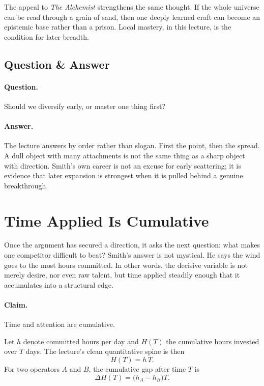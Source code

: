 The appeal to \emph{The Alchemist} strengthens the same thought. If the whole universe can be read through a grain of sand, then one deeply learned craft can become an epistemic base rather than a prison. Local mastery, in this lecture, is the condition for later breadth.

\subsection{Question \& Answer}

\paragraph{Question.}
Should we diversify early, or master one thing first?

\paragraph{Answer.}
The lecture answers by order rather than slogan. First the point, then the spread. A dull object with many attachments is not the same thing as a sharp object with direction. Smith's own career is not an excuse for early scattering; it is evidence that later expansion is strongest when it is pulled behind a genuine breakthrough.

\section{Time Applied Is Cumulative}

Once the argument has secured a direction, it asks the next question: what makes one competitor difficult to beat? Smith's answer is not mystical. He says the wind goes to the most hours committed. In other words, the decisive variable is not merely desire, nor even raw talent, but time applied steadily enough that it accumulates into a structural edge.

\paragraph{Claim.}
Time and attention are cumulative.

Let \(h\) denote committed hours per day and \(H(T)\) the cumulative hours invested over \(T\) days. The lecture's clean quantitative spine is then
\begin{equation}
H(T)=h\,T.
\end{equation}
For two operators \(A\) and \(B\), the cumulative gap after time \(T\) is
\begin{equation}
\Delta H(T)=\bigl(h_A-h_B\bigr)T.
\end{equation}

